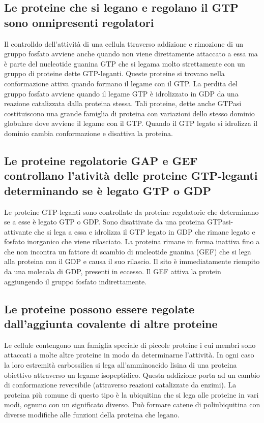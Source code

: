 \subsection{Le proteine che si legano e regolano il GTP sono onnipresenti regolatori}
Il controlldo dell'attivit\`a di una cellula ttraverso addizione e rimozione di un gruppo fosfato avviene anche quando non viene direttamente attaccato a essa ma \`e parte del nucleotide
guanina GTP che si legama molto strettamente con un gruppo di proteine dette GTP-leganti. Queste proteine si trovano nella conformazione attiva quando formano il legame con il GTP. La
perdita del gruppo fosfato avviene quando il legame GTP \`e idrolizzato in GDP da una reazione catalizzata dalla proteina stessa. Tali proteine, dette anche GTPasi costituiscono una 
grande famiglia di proteina con variazioni dello stesso dominio globulare dove avviene il legame con il GTP. Quando il GTP legato si idrolizza il dominio cambia conformazione e disattiva
la proteina.
\subsection{Le proteine regolatorie GAP e GEF controllano l'ativit\`a delle proteine GTP-leganti determinando se \`e legato GTP o GDP}
Le proteine GTP-leganti sono controllate da proteine regolatorie che determinano se a esse \`e legato GTP o GDP. Sono disattivate da una proteina GTPasi-attivante che si lega a essa e 
idrolizza il GTP legato in GDP che rimane legato e fosfato inorganico che viene rilasciato. La proteina rimane in forma inattiva fino a che non incontra un fattore di scambio di 
nucleotide guanina (GEF) che si lega alla proteina con il GDP e causa il suo rilascio. Il sito \`e immediatamente riempito da una molecola di GDP, presenti in eccesso. Il GEF attiva la
protein aggiungendo il gruppo fosfato indirettamente. 
\subsection{Le proteine possono essere regolate dall'aggiunta covalente di altre proteine}
Le cellule contengono una famiglia speciale di piccole proteine i cui membri sono attaccati a molte altre proteine in modo da determinarne l'attivit\`a. In ogni caso la loro estremit\`a
carbossilica si lega all'amminoacido lisina di una proteina obiettivo attraverso un legame isopeptidico. Questa addizione porta ad un cambio di conformazione reversibile (attraverso
reazioni catalizzate da enzimi). La proteina pi\`u comune di questo tipo \`e la ubiquitina che si lega alle proteine in vari modi, ognuno con un significato diverso. Pu\`o formare
catene di poliubiquitina con diverse modifiche alle funzioni della proteina che legano.
